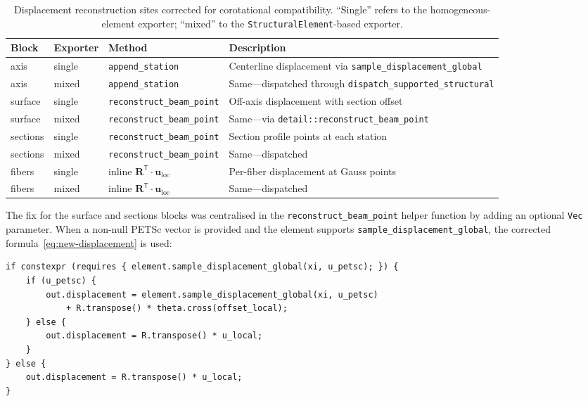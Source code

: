 \begin{table}[htbp]
\centering
\caption{Displacement reconstruction sites corrected for corotational
  compatibility.  ``Single'' refers to the homogeneous-element exporter;
  ``mixed'' to the \texttt{StructuralElement}-based exporter.}
\label{tab:vtk-fix-sites}
\begin{tabular}{llll}
\toprule
  \textbf{Block} & \textbf{Exporter} & \textbf{Method} & \textbf{Description} \\
\midrule
  axis            & single & \texttt{append\_station}
    & Centerline displacement via \texttt{sample\_displacement\_global} \\
  axis            & mixed  & \texttt{append\_station}
    & Same---dispatched through \texttt{dispatch\_supported\_structural} \\
  surface         & single & \texttt{reconstruct\_beam\_point}
    & Off-axis displacement with section offset \\
  surface         & mixed  & \texttt{reconstruct\_beam\_point}
    & Same---via \texttt{detail::reconstruct\_beam\_point} \\
  sections        & single & \texttt{reconstruct\_beam\_point}
    & Section profile points at each station \\
  sections        & mixed  & \texttt{reconstruct\_beam\_point}
    & Same---dispatched \\
  fibers          & single & inline $\mathbf{R}^{\mathsf{T}} \cdot \mathbf{u}_\mathrm{loc}$
    & Per-fiber displacement at Gauss points \\
  fibers          & mixed  & inline $\mathbf{R}^{\mathsf{T}} \cdot \mathbf{u}_\mathrm{loc}$
    & Same---dispatched \\
\bottomrule
\end{tabular}
\end{table}

The fix for the surface and sections blocks was centralised in the
\texttt{reconstruct\_beam\_point} helper function by adding an optional
\texttt{Vec} parameter.  When a non-null PETSc vector is provided and
the element supports \texttt{sample\_displacement\_global}, the corrected
formula~\eqref{eq:new-displacement} is used:
\begin{lstlisting}
if constexpr (requires { element.sample_displacement_global(xi, u_petsc); }) {
    if (u_petsc) {
        out.displacement = element.sample_displacement_global(xi, u_petsc)
            + R.transpose() * theta.cross(offset_local);
    } else {
        out.displacement = R.transpose() * u_local;
    }
} else {
    out.displacement = R.transpose() * u_local;
}
\end{lstlisting}

